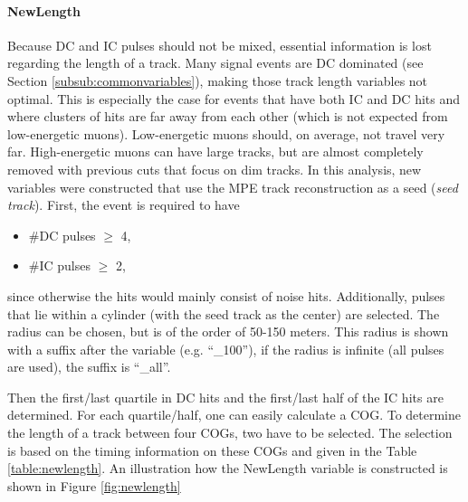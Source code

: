 \paragraph{NewLength}
Because DC and IC pulses should not be mixed, essential information is lost regarding the length of a track. Many signal events are DC dominated (see Section \ref{subsub:commonvariables}), making those track length variables not optimal. This is especially the case for events that have both IC and DC hits and where clusters of hits are far away from each other (which is not expected from low-energetic muons). Low-energetic muons should, on average, not travel very far. High-energetic muons can have large tracks, but are almost completely removed with previous cuts that focus on dim tracks. In this analysis, new variables were constructed that use the MPE track reconstruction as a seed (\textit{seed track}). First, the event is required to have 

\vspace{2mm}
\begin{itemize}
\item \#DC pulses $\geq$ 4,
\item \#IC pulses $\geq$ 2,
\end{itemize}
\vspace{2mm}
since otherwise the hits would mainly consist of noise hits. Additionally,
pulses that lie within a cylinder (with the seed track as the center) are selected. The radius can be chosen, but is of the order of 50-150 meters. This radius is shown with a suffix after the variable (e.g. ``\_100''), if the radius is infinite (all pulses are used), the suffix is ``\_all''. 

Then the first/last quartile in DC hits and the first/last half of the IC hits are determined. For each quartile/half, one can easily calculate a COG. To determine the length of a track between four COGs, two have to be selected. The selection is based on the timing information on these COGs and given in the Table \ref{table:newlength}. An illustration how the NewLength variable is constructed is shown in Figure \ref{fig:newlength}\\


